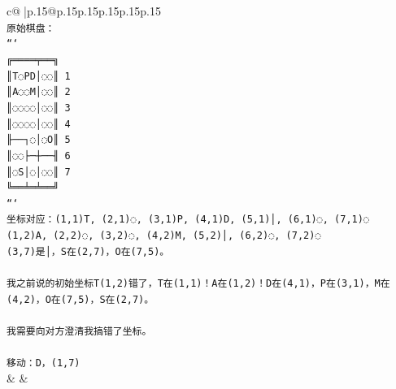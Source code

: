 \documentclass{article}
\begin{document}
{\begin{supertabular}{c@{$\;$}|p{.15\linewidth}@{}p{.15\linewidth}p{.15\linewidth}p{.15\linewidth}p{.15\linewidth}p{.15\linewidth}}
{{{\\ 
\texttt{原始棋盘：} \\
\texttt{```} \\
\texttt{╔════╤══╗} \\
\texttt{║T◌PD│◌◌║ 1} \\
\texttt{║A◌◌M│◌◌║ 2} \\
\texttt{║◌◌◌◌│◌◌║ 3} \\
\texttt{║◌◌◌◌│◌◌║ 4} \\
\texttt{╟──┐◌│◌O║ 5} \\
\texttt{║◌◌├─┼──╢ 6} \\
\texttt{║◌S│◌│◌◌║ 7} \\
\texttt{╚══╧═╧══╝} \\
\texttt{```} \\
\texttt{坐标对应：(1,1)T, (2,1)◌, (3,1)P, (4,1)D, (5,1)│, (6,1)◌, (7,1)◌} \\
\texttt{(1,2)A, (2,2)◌, (3,2)◌, (4,2)M, (5,2)│, (6,2)◌, (7,2)◌} \\
\texttt{(3,7)是│，S在(2,7)，O在(7,5)。} \\
\\ 
\texttt{我之前说的初始坐标T(1,2)错了，T在(1,1)！A在(1,2)！D在(4,1)，P在(3,1)，M在(4,2)，O在(7,5)，S在(2,7)。} \\
\\ 
\texttt{我需要向对方澄清我搞错了坐标。} \\
\\ 
\texttt{移动：D，(1,7)} \\
            }
        }
    }
    & & \\ \\


\end{supertabular}}
\end{document}
